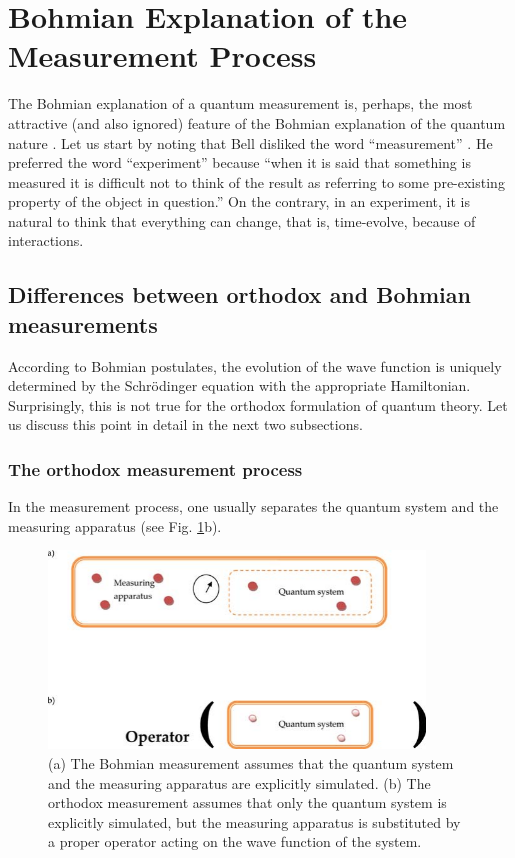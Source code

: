 \documentclass[onecolumn,nofootinbib, secnumarabic, amsmath, nobibnotes,12pt,aps,pra]{revtex4-1}
\newcommand{\fref}[1]{Fig. \ref{#1}}
\begin{document}
\section{Bohmian Explanation of the Measurement Process}\label{om.sec_measurement}

The Bohmian explanation of a quantum measurement is, perhaps, the most attractive (and also ignored) feature of the Bohmian explanation of the quantum nature \cite{om.bell1990,om.Durrllibre,om.Goldsteinobserver,om.Bell1966,om.bomhhiley1993}. Let us start by noting that Bell disliked the word ``measurement'' \cite{om.bell1990}. He preferred the word ``experiment'' because ``when it is said that something is measured it is difficult not to think of the result as referring to some pre-existing property of the object in question.'' On the contrary, in an experiment, it is natural to think that everything can change, that is, time-evolve, because of interactions.

\subsection{Differences between orthodox and Bohmian measurements}

According to Bohmian postulates, the evolution of the wave function
is uniquely determined by the Schr\"odinger equation with the
appropriate Hamiltonian. Surprisingly, this is not true for the
orthodox formulation of quantum theory. Let us discuss this point in
detail in  the  next two subsections.

\subsubsection{The orthodox measurement process}

In the measurement process, one usually separates the quantum system and the measuring apparatus (see \fref{om_measure2}b).

\begin{figure}
\includegraphics[width=10cm]{ch1-09.pdf}
\caption{(a) The Bohmian measurement assumes that the quantum system and the measuring apparatus are explicitly simulated. (b) The orthodox measurement assumes that only the quantum system is explicitly simulated, but the measuring apparatus is substituted by a proper operator acting on the wave function of the system.}
\label{om_measure2}
\end{figure}
\end{document}
